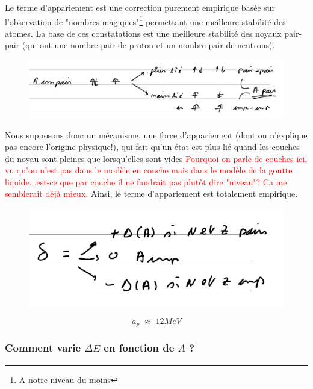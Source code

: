 Le terme d'appariement est une correction purement empirique basée sur l'observation de "nombres magiques"\footnote{A notre niveau du moins} permettant une meilleure stabilité des atomes. La base de ces constatations est une meilleure stabilité des noyaux pair-pair (qui ont une nombre pair de proton et un nombre pair de neutrons).\\
\begin{figure}[ht]
    \centering
    \includegraphics[width=\textwidth]{Images4/appariement.PNG}
\end{figure}

Nous supposons donc un mécanisme, une force d'appariement (dont on n'explique pas encore l'origine physique!), qui fait qu'un état est plus lié quand les couches du noyau sont pleines que lorsqu'elles sont vides \textcolor{red}{Pourquoi on parle de couches ici, vu qu'on n'est pas dans le modèle en couche mais dans le modèle de la goutte liquide...est-ce que par couche il ne faudrait pas plutôt dire "niveau"? Ca me semblerait déjà mieux}. Ainsi, le terme d'appariement est totalement empirique.\\
\begin{figure}[htp]
    \centering
    \includegraphics{Images4/appariement2.PNG}
\end{figure}
\begin{equation*}
    a_p \; \approx \; 12MeV
\end{equation*}



\subsubsection{Comment varie $\Delta E$ en fonction de $A$ ?} 


